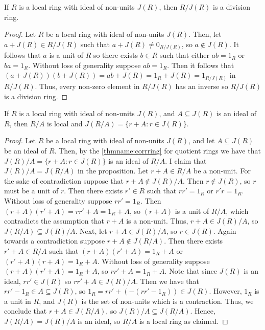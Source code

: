 \begin{proposition}
    If $R$ is a local ring with ideal of non-units $J(R)$, then $R/J(R)$ is a division ring.
    \begin{proof}
        Let $R$ be a local ring with ideal of non-units $J(R)$. Then, let $a+J(R) \in R/J(R)$ such that $a+J(R) \neq 0_{R/J(R)}$, so $a \notin J(R)$. It follows that $a$ is a unit of $R$ so there exists $b \in R$ such that either $ab = 1_R$ or $ba = 1_R$. Without loss of generality suppose $ab = 1_R$. Then it follows that $(a+J(R))(b+J(R)) = ab+J(R) = 1_R + J(R) = 1_{R/J(R)}$ in $R/J(R)$. Thus, every non-zero element in $R/J(R)$ has an inverse so $R/J(R)$ is a division ring.
    \end{proof}
\end{proposition}

\begin{proposition}
    If $R$ is a local ring with ideal of non-units $J(R)$, and $A \subseteq J(R)$ is an ideal of $R$, then $R/A$ is local and $J(R/A) = \{r+A:r \in J(R)\}$.
    \begin{proof}
        Let $R$ be a local ring with ideal of non-units $J(R)$, and let $A \subseteq J(R)$ be an ideal of $R$. Then, by the \ref{thmname:corrring} for quotient rings we have that $J(R)/A = \{r + A: r \in J(R)\}$ is an ideal of $R/A$. I claim that $J(R)/A = J(R/A)$ in the proposition. Let $r+A \in R/A$ be a non-unit. For the sake of contradiction suppose that $r+A \notin J(R)/A$. Then $r \notin J(R)$, so $r$ must be a unit of $r$. Then there exists $r' \in R$ such that $rr' = 1_R$ or $r'r = 1_R$. Without loss of generality suppose $rr' = 1_R$. Then $(r+A)(r'+A) = rr'+A = 1_R+A$, so $(r+A)$ is a unit of $R/A$, which contradicts the assumption that $r+A$ is a non-unit. Thus, $r+A \in J(R)/A$, so $J(R/A) \subseteq J(R)/A$. Next, let $r + A \in J(R)/A$, so $r \in J(R)$. Again towards a contradiction suppose $r + A \notin J(R/A)$. Then there exists $r'+A \in R/A$ such that $(r+A)(r'+A) = 1_R+A$ or $(r'+A)(r+A) = 1_R +A$. Without loss of generality suppose $(r+A)(r'+A) = 1_R +A$, so $rr' + A = 1_R + A$. Note that since $J(R)$ is an ideal, $rr' \in J(R)$ so $rr' + A \in J(R)/A$. Then we have that $rr' - 1_R \in A \subseteq J(R)$, so $1_R = rr' + (-(rr' - 1_R)) \in J(R)$. However, $1_R$ is a unit in $R$, and $J(R)$ is the set of non-units which is a contraction. Thus, we conclude that $r+A \in J(R/A)$, so $J(R)/A \subseteq J(R/A)$. Hence, $J(R/A) = J(R)/A$ is an ideal, so $R/A$ is a local ring as claimed. 
    \end{proof}
\end{proposition}


